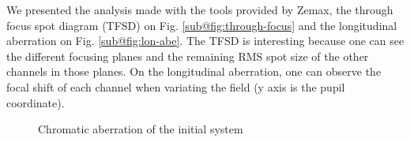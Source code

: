 \documentclass[10pt,letterpaper]{article}
\begin{document}
We presented the analysis made with the tools provided by Zemax, the through focus spot diagram (TFSD) on Fig. \ref{sub@fig:through-focus} and the longitudinal aberration on Fig. \ref{sub@fig:lon-abe}. The TFSD is interesting because one can see the different focusing planes and the remaining RMS spot size of the other channels in those planes. On the longitudinal aberration, one can observe the focal shift of each channel when variating the field (y axis is the pupil coordinate).

\begin{figure}[h]
    \centering
	\caption{Chromatic aberration of the initial system}
\end{figure}
\end{document}
